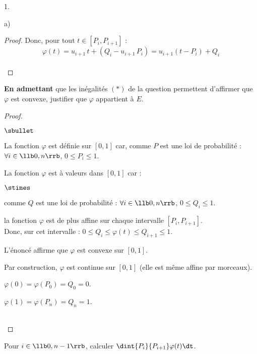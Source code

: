 \begin{noliste}{1.}
\begin{noliste}{a)}
\begin{proof}
      Donc, pour tout $t\in [P_i, P_{i+1}]$ :
      \[
        \varphi(t) = u_{i+1} \, t +(Q_i-u_{i+1} \, P_i) = 
        u_{i+1}(t-P_i) + Q_i
      \]
      ~\\[-1cm]
  \end{proof}
  
  \item \textbf{En admettant} que les inégalités $(\ast)$ de la 
  question  permettent d'affirmer que $\varphi$ est 
  convexe, justifier que $\varphi$ appartient à $E$. 
  
  \begin{proof}~
    \begin{noliste}{$\sbullet$}
      \item La fonction $\varphi$ est définie sur $[0,1]$ car, comme
      $P$ est une loi de probabilité :
      $\forall i \in \llb 0,n \rrb$, $0 \leq P_i \leq 1$.
      \item La fonction $\varphi$ est à valeurs dans $[0,1]$ car :
      \begin{noliste}{$\stimes$}
      \item comme $Q$ est une loi de probabilité :
      $\forall i \in \llb 0,n \rrb$, $0 \leq Q_i \leq 1$.
      \item la fonction $\varphi$ est de plus affine sur chaque 
      intervalle $[P_i,P_{i+1}]$.\\
      Donc, sur cet intervalle : $0 \leq Q_i \leq \varphi(t) \leq 
      Q_{i+1} \leq 1$.
      \end{noliste}
      \item L'énoncé affirme que $\varphi$ est convexe sur $[0,1]$.
      \item Par construction, $\varphi$ est continue sur $[0,1]$ 
      (elle est même affine par morceaux).
      \item $\varphi(0)=\varphi(P_0)=Q_0=0$.
      \item $\varphi(1)=\varphi(P_n) =Q_n =1$.
    \end{noliste}
    ~\\[-1cm]
  \end{proof}

  
  \item Pour $i \in \llb 0,n-1 \rrb$, calculer $\dint{P_i}{P_{i+1}} 
  \varphi(t) \dt$. 
  

\end{noliste}
\end{noliste}
